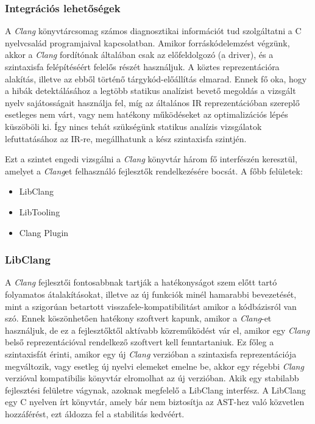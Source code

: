 \documentclass[a4paper,12pt]{report}
\begin{document}
\subsubsection{Integrációs lehetőségek}
A \emph{Clang} könyvtárcsomag számos diagnosztikai információt tud szolgáltatni a C nyelvcsalád programjaival kapcsolatban. Amikor forráskódelemzést végzünk, akkor a \emph{Clang} fordítónak általában csak az előfeldolgozó (a driver), és a szintaxisfa felépítéséért felelős részét használjuk. A köztes reprezentációra alakítás, illetve az ebből történő tárgykód-előállítás elmarad. Ennek fő oka, hogy a hibák detektálásához a legtöbb statikus analízist bevető megoldás a vizsgált nyelv sajátosságait használja fel, míg az általános IR reprezentációban szereplő esetleges nem várt, vagy nem hatékony működéseket az optimalizációs lépés küszöböli ki. Így nincs tehát szükségünk statikus analízis vizsgálatok lefuttatásához az IR-re, megállhatunk a kész szintaxisfa szintjén.

Ezt a szintet engedi vizsgálni a \emph{Clang} könyvtár három fő interfészén keresztül, amelyet a \emph{Clang}et felhasználó fejlesztők rendelkezésére bocsát. A főbb felületek:
\begin{itemize}
\item LibClang
\item LibTooling
\item Clang Plugin
\end{itemize}

\subsubsection{LibClang}
A \emph{Clang} fejlesztői fontosabbnak tartják a hatékonyságot szem előtt tartó folyamatos átalakításokat, illetve az új funkciók minél hamarabbi bevezetését, mint a szigorúan betartott visszafele-kompatibilitást amikor a kódbázisról van szó. Ennek köszönhetően hatékony szoftvert kapunk, amikor a \emph{Clang}-et használjuk, de ez a fejlesztőktől aktívabb közreműködést vár el, amikor egy \emph{Clang} belső reprezentációval rendelkező szoftvert kell fenntartaniuk. Ez főleg a szintaxisfát érinti, amikor egy új \emph{Clang} verzióban a szintaxisfa reprezentációja megváltozik, vagy esetleg új nyelvi elemeket emelne be, akkor egy régebbi \emph{Clang} verzióval kompatibilis könyvtár elromolhat az új verzióban. Akik egy stabilabb fejlesztési felületre vágynak, azoknak megfelelő a LibClang interfész. A LibClang egy C nyelven írt könyvtár, amely bár nem biztosítja az AST-hez való közvetlen  hozzáférést, ezt áldozza fel a stabilitás kedvéért.
\end{document}
